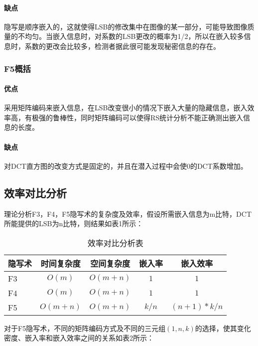 \documentclass[onecolumn,a4paper,12pt]{article}
\begin{document}
\paragraph*{缺点}
隐写是顺序嵌入的，这就使得LSB的修改集中在图像的某一部分，可能导致图像质量的不均匀。当嵌入信息时，对系数的LSB更改的概率为1/2，所以在嵌入较多信息时，系数的更改会比较多，检测者据此很可能发现秘密信息的存在。

\subsubsection{F5概括}

\paragraph*{优点}
采用矩阵编码来嵌入信息，在LSB改变很小的情况下嵌入大量的隐藏信息，嵌入效率高，有极强的鲁棒性，同时矩阵编码可以使得RS统计分析不能正确测出嵌入信息的长度。

\paragraph*{缺点}
对DCT直方图的改变方式是固定的，并且在潜入过程中会使0的DCT系数增加。

\subsection{效率对比分析}

理论分析F3，F4，F5隐写术的复杂度及效率，假设所需嵌入信息为m比特，DCT所能提供的LSB为n比特，则结果如表1所示：

\begin{table}[H]
\centering
\caption{效率对比分析表}\label{效率对比分析表}
\begin{tabular}{lcccc}
\hline
隐写术 &时间复杂度 &空间复杂度 &嵌入率 &嵌入效率 \\ \hline
F3 &$O(m)$ &$O(m+n)$ &$1$ &$1$ \\
F4 &$O(m)$ &$O(m+n)$ &$1$ &$1$ \\
F5 &$O(m+n)$ &$O(m+n)$ &$k/n$ &$(n+1)*k/n$ \\ \hline
\end{tabular}
\end{table}

对于F5隐写术，不同的矩阵编码方式及不同的三元组$(1,n,k)$的选择，使其变化密度、嵌入率和嵌入效率之间的关系如表2所示：
\end{document}
